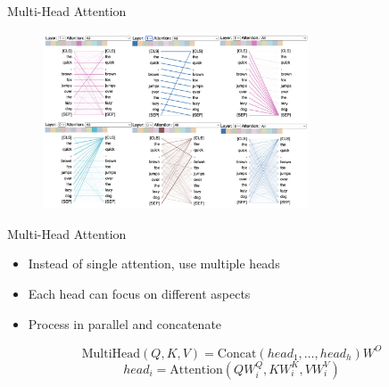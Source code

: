 \documentclass[serif, aspectratio=169]{beamer}
\begin{document}
\begin{frame}{Multi-Head Attention}

    \begin{figure}
        \centering
        \includegraphics[width=0.7\textwidth]{pic/multihead-attention-1.png}
        \label{fig:multihead_attention-1}
    \end{figure}
    \vspace{4pt}
	\vfill
{}
\end{frame}

\begin{frame}{Multi-Head Attention}
    \begin{itemize}
        \item Instead of single attention, use multiple heads
        \item Each head can focus on different aspects
        \item Process in parallel and concatenate
    \end{itemize}
    \begin{equation*}
        \text{MultiHead}(Q,K,V) = \text{Concat}(head_1,\ldots,head_h)W^O
    \end{equation*}
    \begin{equation*}
        head_i = \text{Attention}(QW^Q_i,KW^K_i,VW^V_i)
    \end{equation*}
\end{frame}
\end{document}
